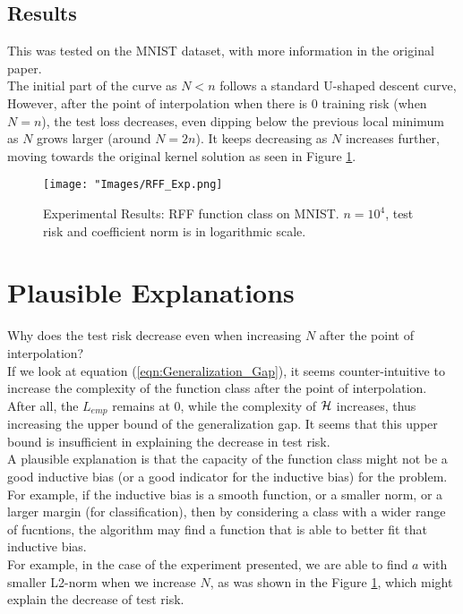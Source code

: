 \documentclass[twoside]{memoir}
\begin{document}
\subsection{Results}
This was tested on the MNIST dataset, with more information in the original paper.\\
The initial part of the curve as $N < n$ follows a standard U-shaped descent curve, However, after the point of interpolation when there is 0 training risk (when $N = n$), the test loss decreases, even dipping below the previous local minimum as $N$ grows larger (around $N = 2n$). It keeps decreasing as $N$ increases further, moving towards the original kernel solution as seen in Figure \ref{fig:RFF_Exp}.

\begin{figure}
	\centering
	\texttt{[image: "Images/RFF\_Exp.png]}
	\par
	\caption{Experimental Results: RFF function class on MNIST. $n=10^4$, test risk and coefficient norm is in logarithmic scale.} \label{fig:RFF_Exp}
\end{figure}

\section{Plausible Explanations}
Why does the test risk decrease even when increasing $N$ after the point of interpolation?\\
If we look at equation (\ref{eqn:Generalization_Gap}), it seems counter-intuitive to increase the complexity of the function class after the point of interpolation. After all, the $L_{emp}$ remains at 0, while the complexity of $\mathcal{H}$ increases, thus increasing the upper bound of the generalization gap. It seems that this upper bound is insufficient in explaining the decrease in test risk.\\
A plausible explanation is that the capacity of the function class might not be a good inductive bias (or a good indicator for the inductive bias) for the problem. For example, if the inductive bias is a smooth function, or a smaller norm, or a larger margin (for classification), then by considering a class with a wider range of fucntions, the algorithm may find a function that is able to better fit that inductive bias.\\
For example, in the case of the experiment presented, we are able to find $a$ with smaller L2-norm when we increase $N$, as was shown in the Figure \ref{fig:RFF_Exp}, which might explain the decrease of test risk.
\end{document}
